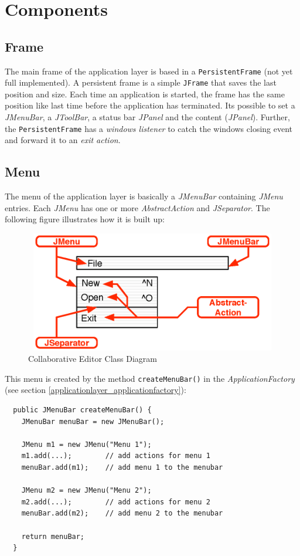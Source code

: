 \section{Components}
\label{applicationlayer_components}

\subsection{Frame}
The main frame of the application layer is based in a \texttt{PersistentFrame} (not yet full implemented). A persistent frame is a simple \texttt{JFrame} that saves the last position and size. Each time an application is started, the frame has the same position like last time before the application has terminated. Its possible to set a \textit{JMenuBar}, a \textit{JToolBar}, a status bar \textit{JPanel} and the content (\textit{JPanel}). Further, the \texttt{PersistentFrame} has a \textit{windows listener} to catch the windows closing event and forward it to an \textit{exit action}.

\subsection{Menu}
The menu of the application layer is basically a \textit{JMenuBar} containing \textit{JMenu} entries. Each \textit{JMenu} has one or more \textit{AbstractAction} and \textit{JSeparator}. The following figure illustrates how it is built up:
\begin{figure}[H]
\begin{center}
  \includegraphics[height= 2.08in, width= 4.85in]{../images/finalreport/application_menu.eps}
\caption{Collaborative Editor Class Diagram}
\label{application_menu}
\end{center}
\end{figure}
This menu is created by the method \texttt{createMenuBar()} in the \textit{ApplicationFactory} (see section \ref{applicationlayer_applicationfactory}):
\begin{verbatim}
  public JMenuBar createMenuBar() {
    JMenuBar menuBar = new JMenuBar();

    JMenu m1 = new JMenu("Menu 1");
    m1.add(...);        // add actions for menu 1
    menuBar.add(m1);    // add menu 1 to the menubar
    
    JMenu m2 = new JMenu("Menu 2");
    m2.add(...);        // add actions for menu 2
    menuBar.add(m2);    // add menu 2 to the menubar
    
    return menuBar;
  }
\end{verbatim}

